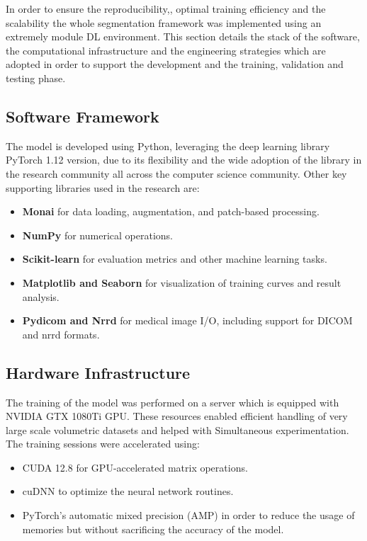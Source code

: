 In order to ensure the reproducibility,, optimal training efficiency and the scalability the whole segmentation framework was implemented using an extremely module DL environment. This section details the stack of the software, the computational infrastructure and the engineering strategies which are adopted in order to support the development and the training, validation and testing phase.

\subsection{Software Framework}
The model is developed using Python, leveraging the deep learning library PyTorch 1.12 version, due to its flexibility and the wide adoption of the library in the research community all across the computer science community. Other key supporting libraries used in the research are:

\begin{itemize} \item \textbf{Monai} for data loading, augmentation, and patch-based processing. \item \textbf{NumPy} for numerical operations. \item \textbf{Scikit-learn} for evaluation metrics and other machine learning tasks. \item \textbf{Matplotlib and Seaborn} for visualization of training curves and result analysis. \item \textbf{Pydicom and Nrrd} for medical image I/O, including support for DICOM and nrrd formats. \end{itemize}

\subsection{Hardware Infrastructure}
The training of the model was performed on a server which is equipped with NVIDIA GTX 1080Ti GPU. These resources enabled efficient handling of very large scale volumetric datasets and helped with Simultaneous experimentation. The training sessions were accelerated using:

\begin{itemize} \item CUDA 12.8 for GPU-accelerated matrix operations. \item cuDNN to optimize the neural network routines. \item PyTorch's automatic mixed precision (AMP) in order to reduce the usage of memories but without sacrificing the accuracy of the model. \end{itemize}

